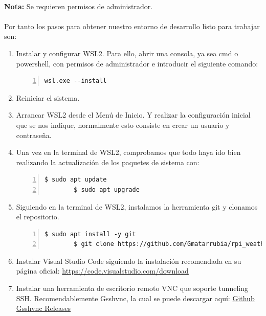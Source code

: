 \paragraph{}\textbf{Nota:} Se requieren permisos de administrador.

\paragraph{}Por tanto los pasos para obtener nuestro entorno de desarrollo listo para
trabajar son:

\begin{enumerate}
    \item Instalar y configurar \gls{WSL2}. Para ello, abrir una consola, ya sea cmd
    o powershell, con permisos de administrador e introducir el siguiente comando:
    \begin{lstlisting}[style=cmd, numbers=left]
        wsl.exe --install
    \end{lstlisting}

    \item Reiniciar el sistema.

    \item Arrancar \gls{WSL2} desde el Menú de Inicio. Y realizar la configuración
    inicial que se nos indique, normalmente esto consiste en crear un usuario y
    contraseña.

    \item Una vez en la terminal de \gls{WSL2}, comprobamos que todo haya ido bien realizando
    la actualización de los paquetes de sistema con:
    \begin{lstlisting}[style=consola, numbers=left]
        $ sudo apt update
        $ sudo apt upgrade
    \end{lstlisting}

    \item Siguiendo en la terminal de \gls{WSL2}, instalamos la herramienta git y clonamos
    el repositorio.
    \begin{lstlisting}[style=consola, numbers=left]
        $ sudo apt install -y git
        $ git clone https://github.com/Gmatarrubia/rpi_weather.git
    \end{lstlisting}

    \item Instalar Visual Studio Code siguiendo la instalación recomendada en su página
    oficial: \href{https://code.visualstudio.com/download}{https://code.visualstudio.com/download}

    \item Instalar una herramienta de escritorio remoto VNC que soporte tunneling SSH.
    Recomendablemente Gsshvnc, la cual se puede descargar aquí:
    \href{https://github.com/zrax/gsshvnc/releases}{Github Gsshvnc Releases}


\end{enumerate}
